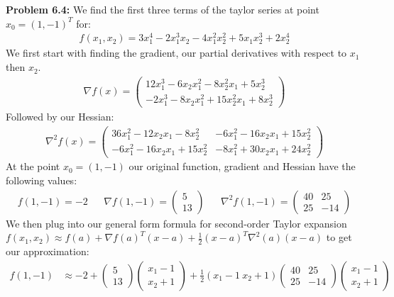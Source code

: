 \documentclass{article}
\begin{document}
\noindent
\textbf{Problem 6.4:} We find the first three terms of the taylor series at point $x_0 = (1,-1)^T$ for:
\begin{align*}
    f(x_1, x_2) = 3x_1^4 - 2x_1^3x_2 - 4x_1^2x_2^2 + 5x_1x_2^3 + 2x_2^4
\end{align*}
We first start with finding the gradient, our partial derivatives with respect to $x_1$ then $x_2$.
\begin{align*}
    \nabla f(x) = 
    \begin{pmatrix}
        12x_1^3 - 6x_2x_1^2 - 8x_2^2x_1 + 5x_2^3 \\
        -2x_1^3 - 8x_2x_1^2 + 15x_2^2x_1 + 8x_2^3
    \end{pmatrix}
\end{align*}
Followed by our Hessian: 
\begin{align*}
    \nabla^2 f(x) = 
    \begin{pmatrix}
        36 x_1^2 - 12 x_2 x_1 - 8 x_2^2 & -6 x_1^2 - 16 x_2 x_1 + 15 x_2^2 \\
        -6 x_1^2 - 16 x_2 x_1 + 15 x_2^2 & -8 x_1^2 + 30 x_2 x_1 + 24 x_2^2
    \end{pmatrix}
\end{align*}
At the point $x_0 = (1,-1)$ our original function, gradient and Hessian have the following values:
\begin{align*}
    f(1,-1) = -2 && 
    \nabla f(1,-1) =
    \begin{pmatrix}
        5 \\ 13
    \end{pmatrix} &&
    \nabla^2 f(1,-1) = 
    \begin{pmatrix}
        40 & 25 \\
        25 & -14
    \end{pmatrix}
\end{align*}
We then plug into our general form formula for second-order Taylor expansion \newline $f(x_1, x_2) \approx f(a) + \nabla f(a)^T (x-a)+\frac{1}{2}(x-a)^T \nabla^2 (a)(x-a)$ to get our approximation:
\begin{align*}
    f(1,-1) & \approx 
    -2 + 
    \begin{pmatrix} 5 \\ 13 \end{pmatrix}
        \begin{pmatrix} x_1-1 \\ x_2 + 1 \end{pmatrix} 
            + \frac{1}{2}(x_1-1 \: x_2+1)
            \begin{pmatrix}
                40 & 25 \\
                25 & -14
            \end{pmatrix}
        \begin{pmatrix} x_1-1 \\ x_2 + 1 \end{pmatrix}
\end{align*}
\end{document}
